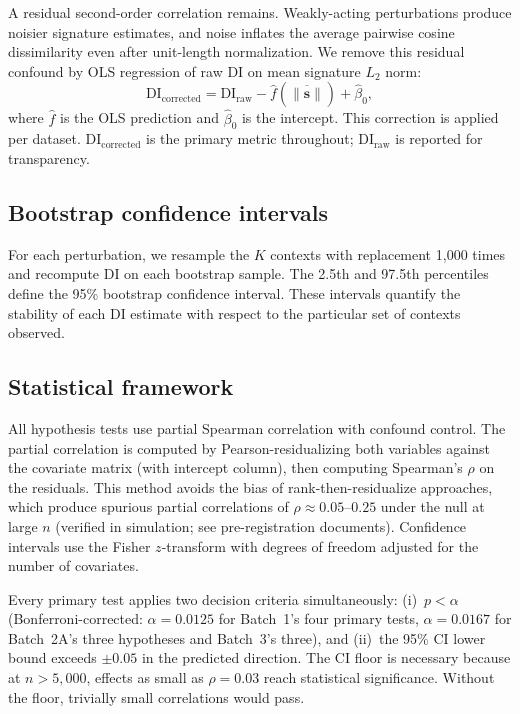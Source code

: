 \documentclass[11pt]{article}
\begin{document}
A residual second-order correlation remains.  Weakly-acting
perturbations produce noisier signature estimates, and noise inflates
the average pairwise cosine dissimilarity even after unit-length
normalization.  We remove this residual confound by OLS regression of
raw DI on mean signature $L_2$ norm:
\begin{equation}
\mathrm{DI}_{\mathrm{corrected}} = \mathrm{DI}_{\mathrm{raw}}
  - \hat{f}(\overline{\|\mathbf{s}\|}) + \hat{\beta}_0,
\label{eq:magnitude}
\end{equation}
where $\hat{f}$ is the OLS prediction and $\hat{\beta}_0$ is the
intercept.  This correction is applied per dataset.
$\mathrm{DI}_{\mathrm{corrected}}$ is the primary metric throughout;
$\mathrm{DI}_{\mathrm{raw}}$ is reported for transparency.

\subsection{Bootstrap confidence intervals}

For each perturbation, we resample the $K$ contexts with replacement
1{,}000 times and recompute DI on each bootstrap sample.  The 2.5th and
97.5th percentiles define the 95\% bootstrap confidence interval.  These
intervals quantify the stability of each DI estimate with respect to the
particular set of contexts observed.

\subsection{Statistical framework}

All hypothesis tests use partial Spearman correlation with confound
control.  The partial correlation is computed by Pearson-residualizing
both variables against the covariate matrix (with intercept column),
then computing Spearman's $\rho$ on the residuals.  This method avoids
the bias of rank-then-residualize approaches, which produce spurious
partial correlations of $\rho \approx 0.05$--$0.25$ under the null at
large $n$ (verified in simulation; see pre-registration documents).
Confidence intervals use the Fisher $z$-transform with degrees of
freedom adjusted for the number of covariates.

Every primary test applies two decision criteria simultaneously:
(i)~$p < \alpha$ (Bonferroni-corrected: $\alpha = 0.0125$ for Batch~1's
four primary tests, $\alpha = 0.0167$ for Batch~2A's three hypotheses
and Batch~3's three), and (ii)~the 95\% CI lower bound
exceeds $\pm 0.05$ in the predicted direction.  The CI floor is
necessary because at $n > 5{,}000$, effects as small as
$\rho = 0.03$ reach statistical significance.  Without the floor,
trivially small correlations would pass.
\end{document}
